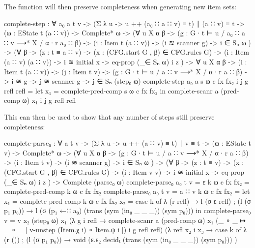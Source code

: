 		The  function will then preserve completeness when
		generating new item sets:

		\begin{code}
			  complete-step : ∀ {a₀ a t v} ->
			    (Σ λ u -> u ++ (a₀ ∷ a ∷ v) ≡ t) ∣ (a ∷ v) ≡ t ->
			    (ω : EState t (a ∷ v)) ->
			    Complete* ω ->
			    (∀ {u X α β} ->
			      (g : G ∙ t ⊢ u / a₀ ∷ a ∷ v ⟶* X / α ∙ r a₀ ∷ β) ->
			      (i : Item t (a ∷ v)) -> (i ≋ scanner g) ->
			      i ∈ Sₙ ω
			    ) ->
			    (∀ {β} ->
			      (z : t ≡ a ∷ v) ->
			      (x : (CFG.start G , β) ∈ CFG.rules G) ->
			      (i : Item (a ∷ v) (a ∷ v)) ->
			      i ≋ initial x -> eq-prop (_∈ Sₙ ω) i z
			    ) ->
			    ∀ {u X α β} ->
			    (i : Item t (a ∷ v)) ->
			    (j : Item t v) ->
			    (g : G ∙ t ⊢ u / a ∷ v ⟶* X / α ∙ r a ∷ β) ->
			    i ≋ g ->
			    j ≋ scanner g ->
			      j ∈ Sₙ (step₀ ω)
			  complete-step {a₀} {a} s ω c fx fx₂ i j g refl refl =
			    let
			      x₁ = complete-pred-comp s ω c fx fx₂
			    in complete-scanr a (pred-comp ω) x₁ i j g refl refl
		\end{code}

		This can then be used to show that any number of steps still preserve
		completeness:

		\begin{code}
			  complete-parse₀ : ∀ {a t v} ->
			    (Σ λ u -> u ++ (a ∷ v) ≡ t) ∣ v ≡ t ->
			    (ω : EState t v) ->
			    Complete* ω ->
			    (∀ {u X α β} ->
			      (g : G ∙ t ⊢ u / a ∷ v ⟶* X / α ∙ r a ∷ β) ->
			      (i : Item t v) -> (i ≋ scanner g) ->
			      i ∈ Sₙ ω
			    ) ->
			    (∀ {β} ->
			      (z : t ≡ v) ->
			      (x : (CFG.start G , β) ∈ CFG.rules G) ->
			      (i : Item v v) ->
			      i ≋ initial x -> eq-prop (_∈ Sₙ ω) i z
			    ) ->
			    Complete (parse₀ ω)
			  complete-parse₀ {a₀} {t} {v = ε} k ω c fx fx₂ = complete-pred-comp k ω c fx fx₂
			  complete-parse₀ {a₀} {t} {v = a ∷ v} k ω c fx fx₂ =
			    let
			      x₁ = complete-pred-comp k ω c fx fx₂
			      x₂ = case k of
			        λ { (r refl) → l (σ ε refl)
			          ; (l (σ p₁ p₀)) → l (σ (p₁ ←∷ a₀) (trans (sym (in₀ _ _ _)) (sym p₀)))
			          }
			    in
			    complete-parse₀ {v = v} x₂ (step₀ ω) x₁
			      (λ {g i refl → complete-scanr a (pred-comp ω) x₁
			        (_ ∘ _ ↦ _ ∘ _ [ v-unstep (Item.χ i) ∘ Item.ψ i ]) i g refl refl})
			      (λ {refl x₂ i x₃ → case k of
			        λ { (r ())
			          ; (l (σ p₁ p₀)) → void (ε.ε₂ decidₜ (trans (sym (in₀ _ _ _)) (sym p₀)))
			          }
			        })
		\end{code}

